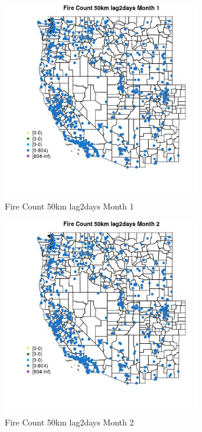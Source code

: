 \begin{figure} 
\centering  
\includegraphics[width=0.77\textwidth]{Code_Outputs/Report_ML_input_PM25_Step4_part_f_de_duplicated_aveswNAs_MapObsMo1Fire_Count_50km_lag2days.jpg} 
\caption{\label{fig:Report_ML_input_PM25_Step4_part_f_de_duplicated_aveswNAsMapObsMo1Fire_Count_50km_lag2days}Fire Count 50km lag2days Month 1} 
\end{figure} 
 

\begin{figure} 
\centering  
\includegraphics[width=0.77\textwidth]{Code_Outputs/Report_ML_input_PM25_Step4_part_f_de_duplicated_aveswNAs_MapObsMo2Fire_Count_50km_lag2days.jpg} 
\caption{\label{fig:Report_ML_input_PM25_Step4_part_f_de_duplicated_aveswNAsMapObsMo2Fire_Count_50km_lag2days}Fire Count 50km lag2days Month 2} 
\end{figure} 
 

